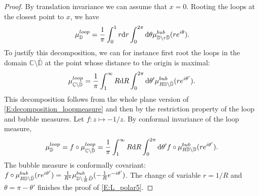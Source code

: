 \documentclass[11pt]{article}
\theoremstyle{remark}
\newcommand{\C}{\mathbb{C}}
\newcommand{\D}{\mathbb{D}}
\renewcommand{\d}{\mathrm{d}}
\def \loopmeasure{\mu^{\rm loop}}
\def \bubmeasure{\mu^{\rm bub}}
\numberwithin{equation}{section}
\begin{document}
\begin{proof}
By translation invariance we can assume that $x=0$.
Rooting the loops at the closest point to $x$, we have
\begin{equation}
\label{E:L_polar5}
\loopmeasure_{\D} = \frac{1}{\pi} \int_0^1 r \d r \int_0^{2\pi} \d \theta \bubmeasure_{\D \setminus r \bar{\D}}(r e^{i\theta}).
\end{equation}
To justify this decomposition, we can for instance first root the loops in the domain $\C \setminus \bar{\D}$ at the point whose distance to the origin is maximal:
\[
\loopmeasure_{\C \setminus \bar{\D}} = \frac{1}{\pi} \int_1^\infty R \d R \int_0^{2\pi} \d \theta' \bubmeasure_{R \D \setminus \bar{\D}}(r e^{i\theta'}).
\]
This decomposition follows from the whole plane version of \eqref{E:decomposition_loopmeasure} and then by the restriction property of the loop and bubble measures.
Let $f: z \mapsto -1/z$. By conformal invariance of the loop measure,
\[
\loopmeasure_\D = f \circ \loopmeasure_{\C \setminus \bar{\D}} = \frac{1}{\pi} \int_1^\infty R \d R \int_0^{2\pi} \d \theta' f \circ \bubmeasure_{R \D \setminus \D}(r e^{i\theta'}).
\]
The bubble measure is conformally covariant: $f \circ \bubmeasure_{R \D \setminus \bar{\D}}(r e^{i\theta'}) = \frac{1}{R^4} \bubmeasure_{\D \setminus \frac{1}{R} \bar{D}}(- \frac{1}{R} e^{-i\theta'})$. The change of variable $r = 1/R$ and $\theta = \pi - \theta'$ finishes the proof of \eqref{E:L_polar5}.


\end{proof}
\end{document}
